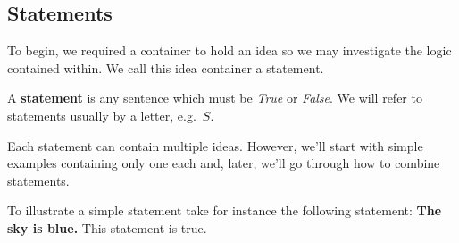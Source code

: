 \subsection{Statements}

To begin, we required a container to hold an idea so we may investigate the logic contained within.
We call this idea container a statement.

\begin{defn}
  \label{defn:statement}
  A \textbf{statement} is any sentence which must be \emph{True} or \emph{False}.
  We will refer to statements usually by a letter, e.g.\ $S$.
\end{defn}

Each statement can contain multiple ideas.
However, we'll start with simple examples containing only one each and, later, we'll go through how to combine statements.

\begin{ex}
  To illustrate a simple statement take for instance the following statement:
  \textbf{The sky is blue.}
  This statement is true.
\end{ex}
